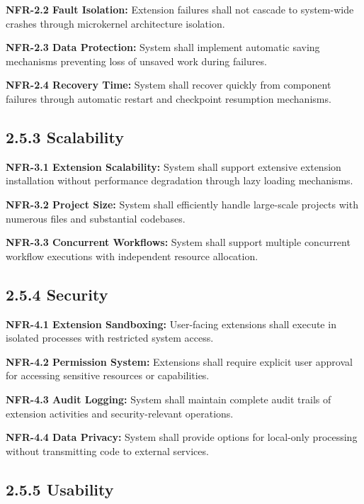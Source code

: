 \textbf{NFR-2.2 Fault Isolation:}
Extension failures shall not cascade to system-wide crashes through microkernel architecture isolation.

\textbf{NFR-2.3 Data Protection:}
System shall implement automatic saving mechanisms preventing loss of unsaved work during failures.

\textbf{NFR-2.4 Recovery Time:}
System shall recover quickly from component failures through automatic restart and checkpoint resumption mechanisms.

\subsection*{2.5.3 Scalability}

\textbf{NFR-3.1 Extension Scalability:}
System shall support extensive extension installation without performance degradation through lazy loading mechanisms.

\textbf{NFR-3.2 Project Size:}
System shall efficiently handle large-scale projects with numerous files and substantial codebases.

\textbf{NFR-3.3 Concurrent Workflows:}
System shall support multiple concurrent workflow executions with independent resource allocation.

\subsection*{2.5.4 Security}

\textbf{NFR-4.1 Extension Sandboxing:}
User-facing extensions shall execute in isolated processes with restricted system access.

\textbf{NFR-4.2 Permission System:}
Extensions shall require explicit user approval for accessing sensitive resources or capabilities.

\textbf{NFR-4.3 Audit Logging:}
System shall maintain complete audit trails of extension activities and security-relevant operations.

\textbf{NFR-4.4 Data Privacy:}
System shall provide options for local-only processing without transmitting code to external services.

\subsection*{2.5.5 Usability}

